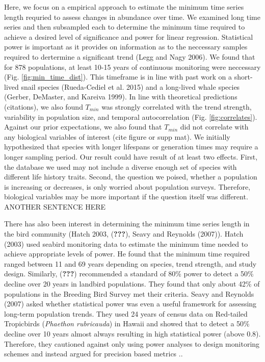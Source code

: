\documentclass[12pt,]{article}
\begin{document}
Here, we focus on a empirical approach to estimate the minimum time
series length requried to assess changes in abundance over time. We
examined long time series and then subsampled each to determine the
minimum time required to achieve a desired level of significance and
power for linear regression. Statistical power is important as it
provides on information as to the neccessary samples required to
dertermine a significant trend (Legg and Nagy 2006). We found that for
878 populations, at least 10-15 years of continuous monitoring were
neccessary (Fig. \ref{fig:min_time_dist}). This timeframe is in line
with past work on a short-lived snail species (Rueda-Cediel et al. 2015)
and a long-lived whale species (Gerber, DeMaster, and Kareiva 1999). In
line with theoretical predictions (citations), we also found \(T_{min}\)
was strongly correlated with the trend strength, variability in
population size, and temporal autocorrelation (Fig.
\ref{fig:correlates}). Against our prior expectations, we also found
that \(T_{min}\) did not correlate with any biological variables of
interest (cite figure or supp mat). We initially hypothesized that
species with longer lifespans or generation times may require a longer
sampling period. Our result could have result of at least two effects.
First, the database we used may not include a diverse enough set of
species with different life history traits. Second, the question we
poised, whether a population is increasing or decreases, is only worried
about population surveys. Therefore, biological variables may be more
important if the question itself was different. ANOTHER SENTENCE HERE

There has also been interest in determining the minimum time series
length in the bird community (Hatch 2003, ({\textbf{???}}), Seavy and
Reynolds (2007)). Hatch (2003) used seabird monitoring data to estimate
the minimum time needed to achieve appropriate levels of power. He found
that the minimum time required ranged between 11 and 69 years depending
on species, trend strength, and study design. Similarly,
({\textbf{???}}) recommended a standard of 80\% power to detect a 50\%
decline over 20 years in landbird populations. They found that only
about 42\% of populations in the Breeding Bird Survey met their
criteria. Seavy and Reynolds (2007) asked whether statistical power was
even a useful framework for assessing long-term population trends. They
used 24 years of census data on Red-tailed Tropicbirds
(\emph{Phaethon rubricauda}) in Hawaii and showed that to detect a 50\%
decline over 10 years almost always resulting in high statistical power
(above 0.8). Therefore, they cautioned against only using power analyses
to design monitoring schemes and instead argued for precision based
metrics ..
\end{document}
